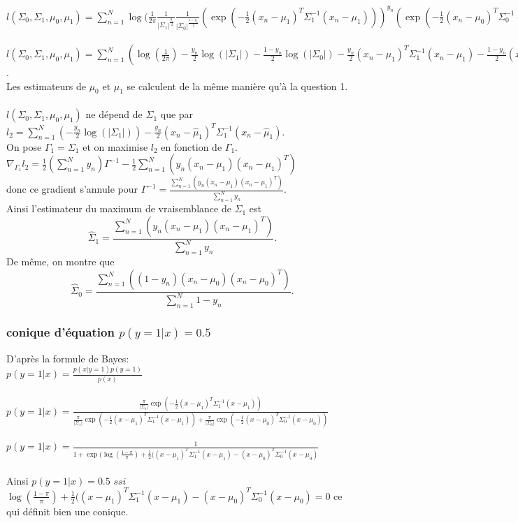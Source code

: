 \documentclass{article}
\begin{document}
$l(\Sigma_{0}, \Sigma_{1}, \mu_0, \mu_1) = \sum_{n=1}^{N} \log(\frac{1}{2\pi}\frac{1}{|\Sigma_{1}|^{\frac{y_{n}}{2}}}\frac{1}{|\Sigma_{0}|^{\frac{1-y_{n}}{2}}} (\exp(-\frac{1}{2}(x_{n}-\mu_{1})^{T}\Sigma_{1}^{-1}(x_{n}-\mu_{1})))^{y_{n}}(\exp(-\frac{1}{2}(x_{n}-\mu_{0})^{T}\Sigma_{0}^{-1}(x_{n}-\mu_{0})))^{1-y_{n}}$ \\ \\
$l(\Sigma_{0}, \Sigma_{1}, \mu_0, \mu_1) = \sum_{n=1}^{N} (\log(\frac{1}{2\pi})-\frac{y_{n}}{2}\log(|\Sigma_{1}|)-\frac{1-y_{n}}{2}\log(|\Sigma_{0}|)-\frac{y_{n}}{2}(x_{n}-\mu_{1})^{T}\Sigma_{1}^{-1}(x_{n}-\mu_{1})-\frac{1-y_{n}}{2}(x_{n}-\mu_{0})^{T}\Sigma-{0}^{-1}(x_{n}-\mu_{0}))$.\\
Les estimateurs de $\mu_0$ et $\mu_1$ se calculent de la même manière qu'à la question 1.\\\\
$l(\Sigma_{0}, \Sigma_{1}, \mu_0, \mu_1)$ ne dépend de $\Sigma_{1}$ que par $l_{2}=\sum_{n=1}^{N}(-\frac{y_{n}}{2}\log(|\Sigma_{1}|))-\frac{y_{n}}{2}(x_{n}- \hat {\mu}_{1})^{T}\Sigma_{1}^{-1}(x_{n}-\hat {\mu}_{1})$. \\
On pose $\Gamma_{1} = \Sigma_1$ et on maximise $l_{2}$ en fonction de $\Gamma_{1}$. \\
$\nabla_{\Gamma_{1}}l_{2}= \frac{1}{2}(\sum_{n=1}^{N}y_{n})\Gamma^{-1}-\frac{1}{2}\sum_{n=1}^{N}(y_{n}(x_{n}-\mu_{1})(x_{n}-\mu_{1})^{T})$\\
donc ce gradient s'annule pour $\Gamma^{-1}=\frac{\sum_{n=1}^{N}(y_{n}(x_{n}-\mu_{1})(x_{n}-\mu_{1})^{T})}{\sum_{n=1}^{N}y_{n}}$.\\
Ainsi l'estimateur du maximum de vraisemblance de $\Sigma_{1}$ est 
$$\hat{\Sigma}_{1} = \frac{\sum_{n=1}^{N}(y_{n}(x_{n}-\mu_{1})(x_{n}-\mu_{1})^{T})}{\sum_{n=1}^{N}y_{n}}.$$
De même, on montre que $$\hat{\Sigma}_{0} = \frac{\sum_{n=1}^{N}((1-y_{n})(x_{n}-\mu_{0})(x_{n}-\mu_{0})^{T})}{\sum_{n=1}^{N}1-y_{n}}.$$

\subsubsection{conique d'équation $p(y=1|x)=0.5$}
D'après la formule de Bayes:\\
$p(y=1|x)=\frac{p(x|y=1)p(y=1)}{p(x)}$\\\\
$p(y=1|x)=\frac{\frac{\pi}{|\Sigma_{1}|}\exp(-\frac{1}{2}(x-\mu_{1})^{T}\Sigma_{1}^{-1}(x-\mu_{1}))}{\frac{\pi}{|\Sigma_{1}|}\exp(-\frac{1}{2}(x-\mu_{1})^{T}\Sigma_{1}^{-1}(x-\mu_{1})) + \frac{\pi}{|\Sigma_{0}|}\exp(-\frac{1}{2}(x-\mu_{0})^{T}\Sigma_{0}^{-1}(x-\mu_{0}))}$\\\\
$p(y=1|x)=\frac{1}{1+\exp(\log(\frac{1-\pi}{\pi})+\frac{1}{2}((x-\mu_{1})^{T}\Sigma_{1}^{-1}(x-\mu_{1}) - (x-\mu_{0})^{T}\Sigma_{0}^{-1}(x-\mu_{0})}$\\\\
Ainsi $p(y=1|x)=0.5$ $ssi$ $\log(\frac{1-\pi}{\pi})+\frac{1}{2}((x-\mu_{1})^{T}\Sigma_{1}^{-1}(x-\mu_{1}) - (x-\mu_{0})^{T}\Sigma_{0}^{-1}(x-\mu_{0}) = 0$ ce qui définit bien une conique.
\end{document}

